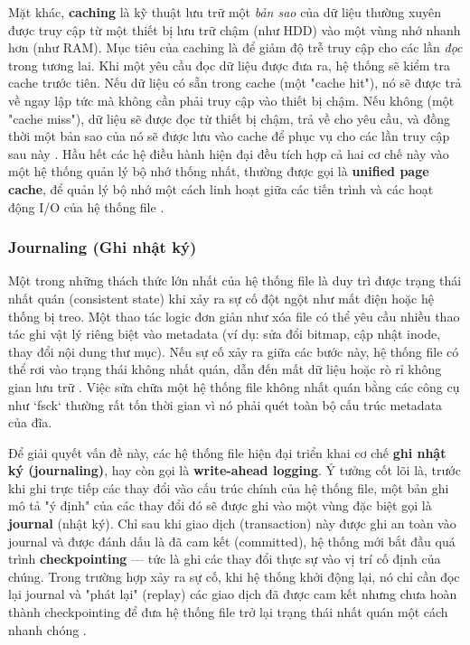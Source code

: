 \documentclass[12pt]{article}
\begin{document}
Mặt khác, \textbf{caching} là kỹ thuật lưu trữ một \textit{bản sao} của dữ liệu thường xuyên được truy cập từ một thiết bị lưu trữ chậm (như HDD) vào một vùng nhớ nhanh hơn (như RAM). Mục tiêu của caching là để giảm độ trễ truy cập cho các lần \textit{đọc} trong tương lai. Khi một yêu cầu đọc dữ liệu được đưa ra, hệ thống sẽ kiểm tra cache trước tiên. Nếu dữ liệu có sẵn trong cache (một "cache hit"), nó sẽ được trả về ngay lập tức mà không cần phải truy cập vào thiết bị chậm. Nếu không (một "cache miss"), dữ liệu sẽ được đọc từ thiết bị chậm, trả về cho yêu cầu, và đồng thời một bản sao của nó sẽ được lưu vào cache để phục vụ cho các lần truy cập sau này \parencite{GeeksForGeeks2025BufferCache}. Hầu hết các hệ điều hành hiện đại đều tích hợp cả hai cơ chế này vào một hệ thống quản lý bộ nhớ thống nhất, thường được gọi là \textbf{unified page cache}, để quản lý bộ nhớ một cách linh hoạt giữa các tiến trình và các hoạt động I/O của hệ thống file \parencite{Silberschatz2018}.

\subsubsection{Journaling (Ghi nhật ký)}
Một trong những thách thức lớn nhất của hệ thống file là duy trì được trạng thái nhất quán (consistent state) khi xảy ra sự cố đột ngột như mất điện hoặc hệ thống bị treo. Một thao tác logic đơn giản như xóa file có thể yêu cầu nhiều thao tác ghi vật lý riêng biệt vào metadata (ví dụ: sửa đổi bitmap, cập nhật inode, thay đổi nội dung thư mục). Nếu sự cố xảy ra giữa các bước này, hệ thống file có thể rơi vào trạng thái không nhất quán, dẫn đến mất dữ liệu hoặc rò rỉ không gian lưu trữ \parencite{LibreTextsJournaling}. Việc sửa chữa một hệ thống file không nhất quán bằng các công cụ như `fsck` thường rất tốn thời gian vì nó phải quét toàn bộ cấu trúc metadata của đĩa.

Để giải quyết vấn đề này, các hệ thống file hiện đại triển khai cơ chế \textbf{ghi nhật ký (journaling)}, hay còn gọi là \textbf{write-ahead logging}. Ý tưởng cốt lõi là, trước khi ghi trực tiếp các thay đổi vào cấu trúc chính của hệ thống file, một bản ghi mô tả "ý định" của các thay đổi đó sẽ được ghi vào một vùng đặc biệt gọi là \textbf{journal} (nhật ký). Chỉ sau khi giao dịch (transaction) này được ghi an toàn vào journal và được đánh dấu là đã cam kết (committed), hệ thống mới bắt đầu quá trình \textbf{checkpointing} --- tức là ghi các thay đổi thực sự vào vị trí cố định của chúng. Trong trường hợp xảy ra sự cố, khi hệ thống khởi động lại, nó chỉ cần đọc lại journal và "phát lại" (replay) các giao dịch đã được cam kết nhưng chưa hoàn thành checkpointing để đưa hệ thống file trở lại trạng thái nhất quán một cách nhanh chóng \parencite{Prabhakaran2005journaling, Jones2008Anatomy}.
\end{document}
